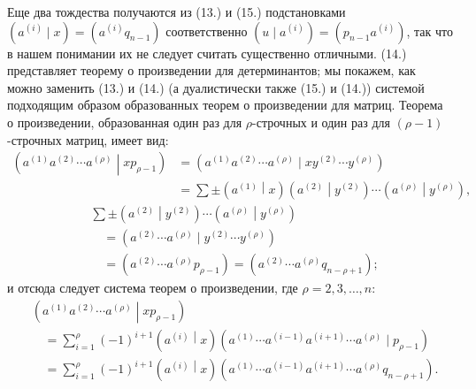 \documentclass[11pt]{article}
\newcommand{\pair}[2]{\left(#1\middle|#2\right)}
\begin{document}
Еще два тождества получаются из (13.) и (15.) подстановками $(a^{(i)}\mid x)=(a^{(i)}q_{n-1})$ соответственно $(u\mid a^{(i)})=(p_{n-1}a^{(i)})$, так что в нашем понимании их не следует считать существенно отличными. (14.) представляет теорему о произведении для детерминантов; мы покажем, как можно заменить (13.) и (14.) (а дуалистически также (15.) и (14.)) системой подходящим образом образованных теорем о произведении для матриц. Теорема о произведении, образованная один раз для $\rho$-строчных и один раз для $(\rho-1)$-строчных матриц, имеет вид:
\[
\begin{aligned}
\pair{a^{(1)}a^{(2)}\cdots a^{(\rho)}}{xp_{\rho-1}}
&=(a^{(1)}a^{(2)}\cdots a^{(\rho)}\mid xy^{(2)}\cdots y^{(\rho)})\\
&=\sum\pm\pair{a^{(1)}}{x}\pair{a^{(2)}}{y^{(2)}}\cdots\pair{a^{(\rho)}}{y^{(\rho)}},
\end{aligned}
\]
\[
\begin{aligned}
&\sum\pm\pair{a^{(2)}}{y^{(2)}}\cdots\pair{a^{(\rho)}}{y^{(\rho)}}\\
&\quad=(a^{(2)}\cdots a^{(\rho)}\mid y^{(2)}\cdots y^{(\rho)})\\
&\quad=(a^{(2)}\cdots a^{(\rho)}p_{\rho-1})
=(a^{(2)}\cdots a^{(\rho)}q_{n-\rho+1});
\end{aligned}
\]
и отсюда следует система теорем о произведении, где $\rho=2,3,\ldots,n$:
\begin{equation}
\begin{aligned}
&\pair{a^{(1)}a^{(2)}\cdots a^{(\rho)}}{xp_{\rho-1}}\\
&\quad=\sum_{i=1}^{\rho}(-1)^{i+1}\pair{a^{(i)}}{x}
(a^{(1)}\cdots a^{(i-1)}a^{(i+1)}\cdots a^{(\rho)}\mid p_{\rho-1})\\
&\quad=\sum_{i=1}^{\rho}(-1)^{i+1}\pair{a^{(i)}}{x}
(a^{(1)}\cdots a^{(i-1)}a^{(i+1)}\cdots a^{(\rho)}q_{n-\rho+1}).
\end{aligned}
\tag{16}
\end{equation}
\end{document}
